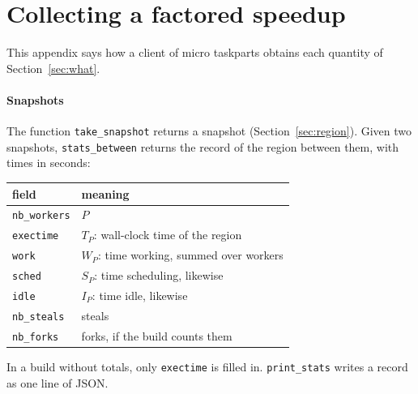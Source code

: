 \documentclass[sigplan,nonacm]{acmart}
\begin{document}



\clearpage
\appendix

\section{Collecting a factored speedup}
\label{sec:collect}

This appendix says how a client of micro taskparts obtains each
quantity of Section~\ref{sec:what}.

\paragraph{Snapshots}
%
The function \lstinline|take_snapshot| returns a snapshot
(Section~\ref{sec:region}).
%
Given two snapshots, \lstinline|stats_between| returns the record of
the region between them, with times in seconds:
%
\begin{center}
\small
\begin{tabular}{@{}ll@{}}
\toprule
field & meaning \\
\midrule
\lstinline|nb_workers| & $P$ \\
\lstinline|exectime| & $T_P$: wall-clock time of the region \\
\lstinline|work| & $W_P$: time working, summed over workers \\
\lstinline|sched| & $S_P$: time scheduling, likewise \\
\lstinline|idle| & $I_P$: time idle, likewise \\
\lstinline|nb_steals| & steals \\
\lstinline|nb_forks| & forks, if the build counts them \\
\bottomrule
\end{tabular}
\end{center}
%
In a build without totals, only \lstinline|exectime| is filled in.
%
\lstinline|print_stats| writes a record as one line of JSON.
\end{document}

